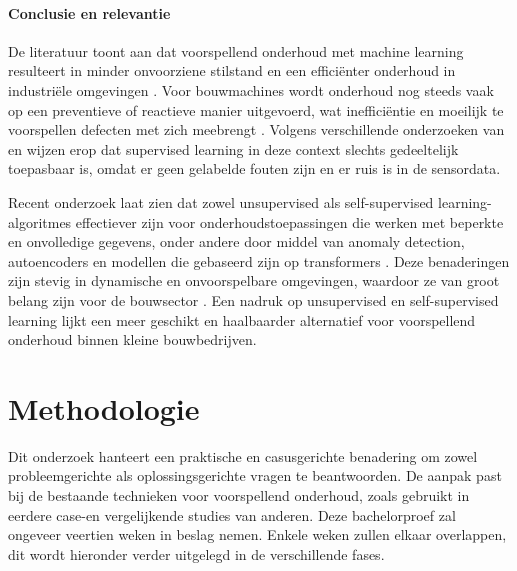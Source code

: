 \paragraph{Conclusie en relevantie}

De literatuur toont aan dat voorspellend onderhoud met machine learnin\-g resulteert in minder onvoorziene stilstand en een efficiënter onderhoud in industriële omgevingen \autocite{Carvalho2019, ErRatby2025}. Voor bouwmachines wordt onderhoud nog steeds vaak op een preventieve of reactieve manier uitgevoerd, wat inefficiëntie en moeilijk te voorspellen defecten met zich meebrengt \autocite{Mikulic2024}. Volgens verschillende onderzoeken van \textcite{Elahi2023} en \textcite{Wang2025} wijzen erop dat supervised learning in deze context slechts gedeeltelijk toepasbaar is, omdat er geen gelabelde fouten zijn en er ruis is in de sensordata.

Recent onderzoek laat zien dat zowel unsupervised als self-supervised learning-algoritmes effectiever zijn voor onderhoudstoepassingen die werken met beperkte en onvolledige gegevens, onder andere door middel van anomaly detection, autoencoders en modellen die gebaseerd zijn op transformers \autocite{Giannoulidis2024, Aggarwal2025, Holtz2025}. Deze benaderingen zijn stevig in dynamische en onvoorspelbare omgevingen, waardoor ze van groot belang zijn voor de bouwsector \autocite{Mahale2025}. Een nadruk op unsupervised en self-supervised learni\-ng lijkt een meer geschikt en haalbaarder alternatief voor voorspellend onderhoud binnen kleine bouwbedrijven.


\section{Methodologie}%
\label{sec:methodologie}

Dit onderzoek hanteert een praktische en casusgerichte benadering om zowel probleemgerichte als oplossingsgerichte vragen te beantwoorden. De aanpak past bij de bestaande technieken voor voorspellend onderhoud, zoals gebruikt in eerdere case-en vergelijkende studies van anderen. Deze bachelorproef zal ongeveer veertien weken in beslag nemen. Enkele weken zullen elkaar overlappen, dit wordt hieronder verder uitgelegd in de verschillende fases.

